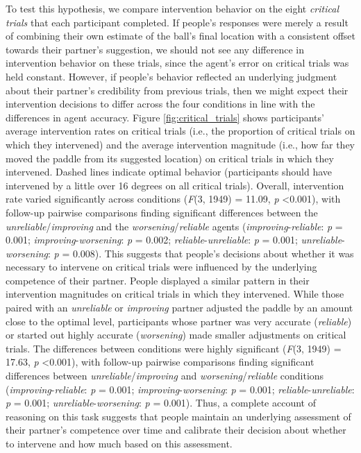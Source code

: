 \documentclass[10pt,letterpaper]{article}
\begin{document}
To test this hypothesis, we compare intervention behavior on the eight \textit{critical trials} that each participant completed. If people's responses were merely a result of combining their own estimate of the ball's final location with a consistent offset towards their partner's suggestion, we should not see any difference in intervention behavior on these trials, since the agent's error on critical trials was held constant. However, if people's behavior reflected an underlying judgment about their partner's credibility from previous trials, then we might expect their intervention decisions to differ across the four conditions in line with the differences in agent accuracy. Figure \ref{fig:critical_trials} shows participants' average intervention rates on critical trials (i.e., the proportion of critical trials on which they intervened) and the average intervention magnitude (i.e., how far they moved the paddle from its suggested location) on critical trials in which they intervened. Dashed lines indicate optimal behavior (participants should have intervened by a little over 16 degrees on all critical trials). Overall, intervention rate varied significantly across conditions (\textit{F}(3, 1949) = 11.09, \textit{p} \textless{0.001}), with follow-up pairwise comparisons finding significant differences between the \textit{unreliable}/\textit{improving} and the \textit{worsening}/\textit{reliable} agents (\textit{improving}-\textit{reliable}: \textit{p} = 0.001; \textit{improving}-\textit{worsening}: \textit{p} = 0.002; \textit{reliable}-\textit{unreliable}: \textit{p} = 0.001; \textit{unreliable}-\textit{worsening}: \textit{p} = 0.008). This suggests that people's decisions about whether it was necessary to intervene on critical trials were influenced by the underlying competence of their partner. People displayed a similar pattern in their intervention magnitudes on critical trials in which they intervened. While those paired with an \textit{unreliable} or \textit{improving} partner adjusted the paddle by an amount close to the optimal level, participants whose partner was very accurate (\textit{reliable}) or started out highly accurate (\textit{worsening}) made smaller adjustments on critical trials. The differences between conditions were highly significant (\textit{F}(3, 1949) = 17.63, \textit{p} \textless{0.001}), with follow-up pairwise comparisons finding significant differences between \textit{unreliable}/\textit{improving} and \textit{worsening}/\textit{reliable} conditions (\textit{improving}-\textit{reliable}: \textit{p} = 0.001; \textit{improving}-\textit{worsening}: \textit{p} = 0.001; \textit{reliable}-\textit{unreliable}: \textit{p} = 0.001; \textit{unreliable}-\textit{worsening}: \textit{p} = 0.001). Thus, a complete account of reasoning on this task suggests that people maintain an underlying assessment of their partner's competence over time and calibrate their decision about whether to intervene and how much based on this assessment.
\end{document}
